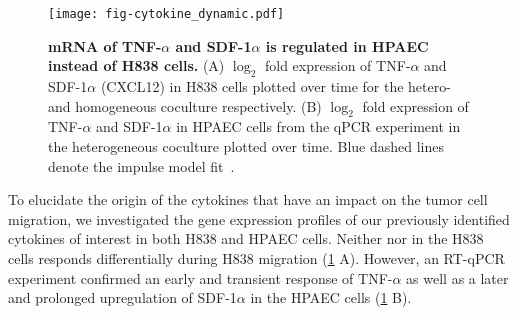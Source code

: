 \begin{figure}[!ht]
\begin{center}
\texttt{[image: fig-cytokine\_dynamic.pdf]}
\end{center}
\caption[Gene expression of \tnfa and \sdfonea]{
{\bf mRNA of TNF-$\alpha$ and SDF-1$\alpha$ is regulated in HPAEC instead of H838 
cells.}
(A) $\log_2$ fold expression of TNF-$\alpha$ and SDF-1$\alpha$ (CXCL12) in H838 
cells plotted
over time for the hetero- and homogeneous coculture respectively.
(B) $\log_2$ fold expression of TNF-$\alpha$ and SDF-1$\alpha$ in HPAEC cells 
from the qPCR
experiment in the heterogeneous coculture plotted
over time. Blue dashed lines denote the impulse model fit~\cite{Chechik2009}.
}
\label{fig:cytokine_dynamic}
\end{figure}

To elucidate the origin of the cytokines that have an impact on the tumor
cell migration,
we investigated the gene expression profiles of
our previously identified cytokines of interest in both H838 and HPAEC cells. 
Neither \tnfa nor \sdfonea in the H838 cells
responds differentially during H838 migration (\ref{fig:cytokine_dynamic} A).
However, 
an RT-qPCR experiment confirmed an early and transient response of  
TNF-$\alpha$ as well as a later and prolonged upregulation of 
SDF-1$\alpha$ in the HPAEC cells (\ref{fig:cytokine_dynamic} B). 


